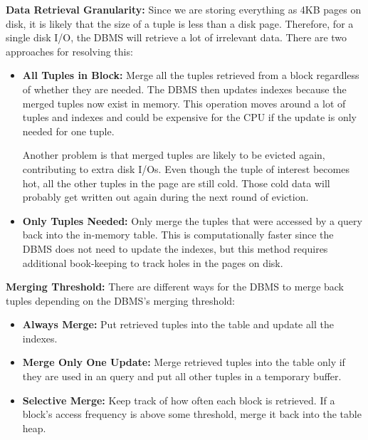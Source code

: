 \documentclass[11pt]{article}
\begin{document}
\textbf{Data Retrieval Granularity:} Since we are storing everything as 4KB pages on disk, it is likely that the size of a tuple is less than a disk page. Therefore, for a single disk I/O, the DBMS will retrieve a lot of irrelevant data. There are two approaches for resolving this:
\begin{itemize}
    \item \textbf{All Tuples in Block:} Merge all the tuples retrieved from a block regardless of whether they are needed. The DBMS then updates indexes because the merged tuples now exist in memory. This operation moves around a lot of tuples and indexes and could be expensive for the CPU if the update is only needed for one tuple. 
    
    Another problem is that merged tuples are likely to be evicted again, contributing to extra disk I/Os. Even though the tuple of interest becomes hot, all the other tuples in the page are still cold. Those cold data will probably get written out again during the next round of eviction.
    \item \textbf{Only Tuples Needed:} Only merge the tuples that were accessed by a query back into the in-memory table. This is computationally faster since the DBMS does not need to update the indexes, but this method requires additional book-keeping to track holes in the pages on disk.
\end{itemize}

\textbf{Merging Threshold:} There are different ways for the DBMS to merge back tuples depending on the DBMS's merging threshold:
\begin{itemize}
    \item \textbf{Always Merge:} Put retrieved tuples into the table and update all the indexes.
    \item \textbf{Merge Only One Update:} Merge retrieved tuples into the table only if they are used in an  query and put all other tuples in a temporary buffer.
    \item \textbf{Selective Merge:} Keep track of how often each block is retrieved. If a block’s access frequency is above some threshold, merge it back into the table heap. 
\end{itemize}
\end{document}
